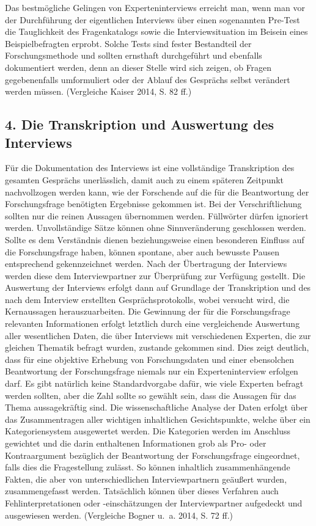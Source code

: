 \documentclass[a4paper,
fontsize=11pt,
oneside,
numbers=noperiodatend,
parskip=half-,
bibliography=totoc,
final
]{scrartcl}
\begin{document}
Das bestmögliche Gelingen von Experteninterviews erreicht man, wenn man
vor der Durchführung der eigentlichen Interviews über einen sogenannten
Pre-Test die Tauglichkeit des Fragenkatalogs sowie die
Interviewsituation im Beisein eines Beispielbefragten erprobt. Solche
Tests sind fester Bestandteil der Forschungsmethode und sollten
ernsthaft durchgeführt und ebenfalls dokumentiert werden, denn an dieser
Stelle wird sich zeigen, ob Fragen gegebenenfalls umformuliert oder der
Ablauf des Gesprächs selbst verändert werden müssen. (Vergleiche Kaiser
2014, S. 82 ff.)

\subsection{4. Die Transkription und Auswertung des
Interviews}\label{die-transkription-und-auswertung-des-interviews}

Für die Dokumentation des Interviews ist eine vollständige Transkription
des gesamten Gesprächs unerlässlich, damit auch zu einem späteren
Zeitpunkt nachvollzogen werden kann, wie der Forschende auf die für die
Beantwortung der Forschungsfrage benötigten Ergebnisse gekommen ist. Bei
der Verschriftlichung sollten nur die reinen Aussagen übernommen werden.
Füllwörter dürfen ignoriert werden. Unvollständige Sätze können ohne
Sinnveränderung geschlossen werden. Sollte es dem Verständnis dienen
beziehungsweise einen besonderen Einfluss auf die Forschungsfrage haben,
können spontane, aber auch bewusste Pausen entsprechend gekennzeichnet
werden. Nach der Übertragung der Interviews werden diese dem
Interviewpartner zur Überprüfung zur Verfügung gestellt. Die Auswertung
der Interviews erfolgt dann auf Grundlage der Transkription und des nach
dem Interview erstellten Gesprächsprotokolls, wobei versucht wird, die
Kernaussagen herauszuarbeiten. Die Gewinnung der für die Forschungsfrage
relevanten Informationen erfolgt letztlich durch eine vergleichende
Auswertung aller wesentlichen Daten, die über Interviews mit
verschiedenen Experten, die zur gleichen Thematik befragt wurden,
zustande gekommen sind. Dies zeigt deutlich, dass für eine objektive
Erhebung von Forschungsdaten und einer ebensolchen Beantwortung der
Forschungsfrage niemals nur ein Experteninterview erfolgen darf. Es gibt
natürlich keine Standardvorgabe dafür, wie viele Experten befragt werden
sollten, aber die Zahl sollte so gewählt sein, dass die Aussagen für das
Thema aussagekräftig sind. Die wissenschaftliche Analyse der Daten
erfolgt über das Zusammentragen aller wichtigen inhaltlichen
Gesichtspunkte, welche über ein Kategoriensystem ausgewertet werden. Die
Kategorien werden im Anschluss gewichtet und die darin enthaltenen
Informationen grob als Pro- oder Kontraargument bezüglich der
Beantwortung der Forschungsfrage eingeordnet, falls dies die
Fragestellung zulässt. So können inhaltlich zusammenhängende Fakten, die
aber von unterschiedlichen Interviewpartnern geäußert wurden,
zusammengefasst werden. Tatsächlich können über dieses Verfahren auch
Fehlinterpretationen oder -einschätzungen der Interviewpartner
aufgedeckt und ausgewiesen werden. (Vergleiche Bogner u.~a. 2014, S. 72
ff.)
\end{document}
